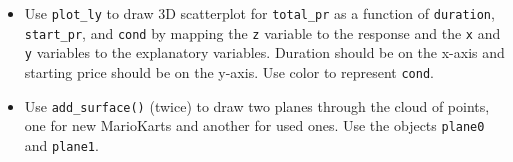 \documentclass[
]{book}
\newenvironment{Shaded}{\begin{snugshade}}{\end{snugshade}}
\newcommand{\CommentTok}[1]{\textcolor[rgb]{0.56,0.35,0.01}{\textit{#1}}}
\newcommand{\DataTypeTok}[1]{\textcolor[rgb]{0.13,0.29,0.53}{#1}}
\newcommand{\FloatTok}[1]{\textcolor[rgb]{0.00,0.00,0.81}{#1}}
\newcommand{\KeywordTok}[1]{\textcolor[rgb]{0.13,0.29,0.53}{\textbf{#1}}}
\newcommand{\NormalTok}[1]{#1}
\newcommand{\OperatorTok}[1]{\textcolor[rgb]{0.81,0.36,0.00}{\textbf{#1}}}
\newcommand{\OtherTok}[1]{\textcolor[rgb]{0.56,0.35,0.01}{#1}}
\newcommand{\StringTok}[1]{\textcolor[rgb]{0.31,0.60,0.02}{#1}}
\providecommand{\tightlist}{%
  \setlength{\itemsep}{0pt}\setlength{\parskip}{0pt}}
\begin{document}
\begin{itemize}
\tightlist
\item
  Use \texttt{plot\_ly} to draw 3D scatterplot for \texttt{total\_pr} as a function of \texttt{duration}, \texttt{start\_pr}, and \texttt{cond} by mapping the \texttt{z} variable to the response and the \texttt{x} and \texttt{y} variables to the explanatory variables. Duration should be on the x-axis and starting price should be on the y-axis. Use color to represent \texttt{cond}.
\end{itemize}

\begin{Shaded}
\end{Shaded}

\begin{itemize}
\tightlist
\item
  Use \texttt{add\_surface()} (twice) to draw two planes through the cloud of points, one for new MarioKarts and another for used ones. Use the objects \texttt{plane0} and \texttt{plane1}.
\end{itemize}

\begin{Shaded}
\end{Shaded}
\end{document}
